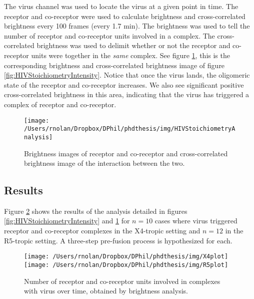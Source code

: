 \documentclass[12pt,]{book}
\theoremstyle{definition}
\theoremstyle{definition}
\theoremstyle{definition}
\theoremstyle{remark}
\begin{document}
The virus channel was used to locate the virus at a given point in time.
The receptor and co-receptor were used to calculate brightness and
cross-correlated brightness every 100 frames (every 1.7 min). The
brightness was used to tell the number of receptor and co-receptor units
involved in a complex. The cross-correlated brightness was used to
delimit whether or not the receptor and co-receptor units were together
in the \emph{same} complex. See figure
\ref{fig:HIVStoichiometryAnalysis}, this is the corresponding brightness
and cross-correlated brightness image of figure
\ref{fig:HIVStoichiometryIntensity}. Notice that once the virus lands,
the oligomeric state of the receptor and co-receptor increases. We also
see significant positive cross-correlated brightness in this area,
indicating that the virus has triggered a complex of receptor and
co-receptor.





\begin{figure}

\texttt{[image: /Users/rnolan/Dropbox/DPhil/phdthesis/img/HIVStoichiometryAnalysis]} \hfill{}

\caption{Brightness images of receptor and
co-receptor and cross-correlated brightness image of the interaction
between the two.}\label{fig:HIVStoichiometryAnalysis}
\end{figure}

\subsection{Results}\label{results}

Figure \ref{fig:HIVStoichiometryPlots} shows the results of the analysis
detailed in figures \ref{fig:HIVStoichiometryIntensity} and
\ref{fig:HIVStoichiometryAnalysis} for \(n=10\) cases where virus
triggered receptor and co-receptor complexes in the X4-tropic setting
and \(n=12\) in the R5-tropic setting. A three-step pre-fusion process
is hypothesized for each.





\begin{figure}

\texttt{[image: /Users/rnolan/Dropbox/DPhil/phdthesis/img/X4plot]} \texttt{[image: /Users/rnolan/Dropbox/DPhil/phdthesis/img/R5plot]} \hfill{}

\caption{Number of receptor and co-receptor
units involved in complexes with virus over time, obtained by brightness
analysis.}\label{fig:HIVStoichiometryPlots}
\end{figure}
\end{document}
